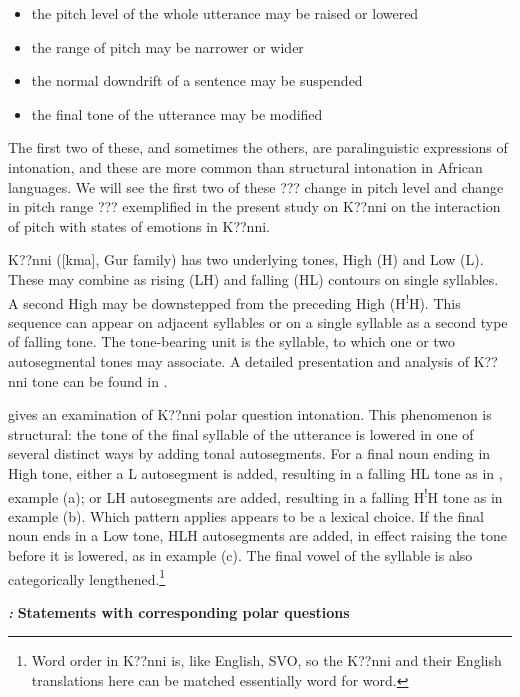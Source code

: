 \documentclass[output=paper]{langsci/langscibook}
\begin{document}
\begin{itemize}
\item the pitch level of the whole utterance may be raised or lowered
\item the range of pitch may be narrower or wider
\item the normal downdrift of a sentence may be suspended
\item the final tone of the utterance may be modified
\end{itemize}

The first two of these, and sometimes the others, are paralinguistic expressions of intonation, and these are more common than structural intonation in African languages. We will see the first two of these ??? change in pitch level and change in pitch range ??? exemplified in the present study on K??nni on the interaction of pitch with states of emotions in K??nni.

K??nni ([kma], Gur family) has two underlying tones, High (H) and Low (L). These may combine as rising (LH) and falling (HL) contours on single syllables. A second High may be downstepped from the preceding High (H\textsuperscript{!}H). This sequence can appear on adjacent syllables or on a single syllable as a second type of falling tone. The tone-bearing unit is the syllable, to which one or two autosegmental tones may associate. A detailed presentation and analysis of K??nni tone can be found in \citet{Cahill2007}. 

\citet{Cahill2012} gives an examination of K??nni polar question intonation. This phenomenon is structural: the tone of the final syllable of the utterance is lowered in one of several distinct ways by adding tonal autosegments. For a final noun ending in High tone, either a L autosegment is added, resulting in a falling HL tone as in , example (a); or LH autosegments are added, resulting in a falling H\textsuperscript{!}H tone as in example (b). Which pattern applies appears to be a lexical choice. If the final noun ends in a Low tone, HLH autosegments are added, in effect raising the tone before it is lowered, as in example (c). The final vowel of the syllable is also categorically lengthened.\footnote{ Word order in K??nni is, like English, SVO, so the K??nni and their English translations here can be matched essentially word for word.}

\emph{\textbf{\textup{:}}}\textbf{ }\textbf{Statements with corresponding polar questions}
\end{document}

